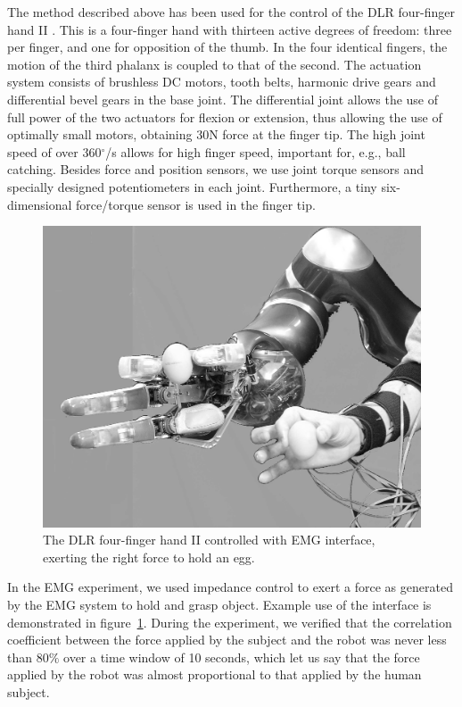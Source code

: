 The method described above has been used for the control of the DLR
four-finger hand II \cite{ButFisGre2004}. This is a four-finger hand
with thirteen active degrees of freedom: three per finger, and one for
opposition of the thumb.  In the four identical fingers, the motion of
the third phalanx is coupled to that of the second. The actuation
system consists of brushless DC motors, tooth belts, harmonic drive
gears and differential bevel gears in the base joint. The differential
joint allows the use of full power of the two actuators for flexion or
extension, thus allowing the use of optimally small motors, obtaining
30N force at the finger tip. The high joint speed of over
360$^\circ$/s allows for high finger speed, important for, e.g., ball
catching. Besides force and position sensors, we use joint torque
sensors and specially designed potentiometers in each joint.
Furthermore, a tiny six-dimensional force/torque sensor is used in the
finger tip.

\begin{figure}
  \includegraphics[width=\columnwidth]{figs/egg-in-hand.jpg}
  \caption{The DLR four-finger hand II controlled with EMG interface, exerting the right force to hold an egg.}
  \label{fig:egg-hand}
\end{figure}

In the EMG experiment, we used impedance control to exert a force as
generated by the EMG system to hold and grasp object. Example use of
the interface is demonstrated in figure~\ref{fig:egg-hand}. During the
experiment, we verified that the correlation coefficient between the
force applied by the subject and the robot was never less than $80\%$
over a time window of 10 seconds, which let us say that the force
applied by the robot was almost proportional to that applied by the
human subject.

